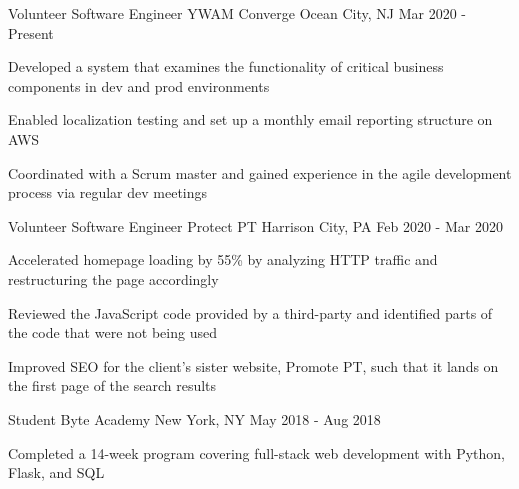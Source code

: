 

\begin{cventries}

\cventry
  {Volunteer Software Engineer} %
  {YWAM Converge} %
  {Ocean City, NJ} %
  {Mar 2020 - Present} %
  {
    \begin{cvitems} %
      \item {Developed a system that examines the functionality of critical business components in dev and prod environments}
      \item {Enabled localization testing and set up a monthly email reporting structure on AWS}
      \item {Coordinated with a Scrum master and gained experience in the agile development process via regular dev meetings}
    \end{cvitems}
  }

\cventry
  {Volunteer Software Engineer} %
  {Protect PT} %
  {Harrison City, PA} %
  {Feb 2020 - Mar 2020} %
  {
    \begin{cvitems} %
      \item {Accelerated homepage loading by 55\% by analyzing HTTP traffic and restructuring the page accordingly}
      \item {Reviewed the JavaScript code provided by a third-party and identified parts of the code that were not being used}
      \item {Improved SEO for the client's sister website, Promote PT, such that it lands on the first page of the search results}
    \end{cvitems}
  }

  \cventry
    {Student} %
    {Byte Academy} %
    {New York, NY} %
    {May 2018 - Aug 2018} %
    {
      \begin{cvitems} %
        \item {Completed a 14-week program covering full-stack web development with Python, Flask, and SQL}
      \end{cvitems}
    }


\end{cventries}
